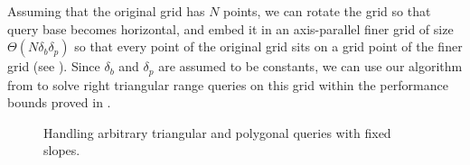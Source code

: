 Assuming that the original grid has $N$ points, we can rotate the grid
so that query base becomes horizontal, and embed it in an axis-parallel
finer grid of size $\Theta( N \delta_b \delta_p )$ so that every
point of the original grid sits on a grid point of the finer grid
(see ).  Since $\delta_b$ and
$\delta_p$ are assumed to be constants, we can use our algorithm from
 to solve right triangular range queries on this grid
within the performance bounds proved in .

\begin{figure}[t!]
\centering
{}
\hfill
\hfill
\caption{Handling arbitrary triangular and polygonal queries with fixed slopes.}
\label{fig:rotated-arbitrary-triangle}
\end{figure}

